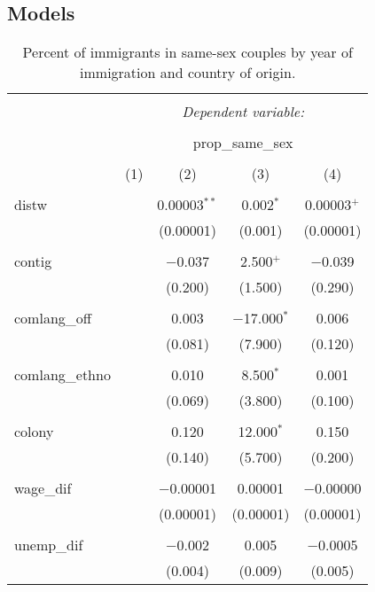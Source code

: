 \documentclass[
  11pt,
]{article}
\begin{document}
\hypertarget{models}{%
\subsection{Models}\label{models}}

\begin{table}[!htbp] \centering 
  \caption{Percent of immigrants in same-sex couples by year of immigration and country of origin.} 
  \label{tab:country-props} 
\begin{tabular}{@{\extracolsep{5pt}}lcccc} 
\\[-1.8ex]\hline 
\hline \\[-1.8ex] 
 & \multicolumn{4}{c}{\textit{Dependent variable:}} \\ 
\cline{2-5} 
\\[-1.8ex] & \multicolumn{4}{c}{prop\_same\_sex} \\ 
\\[-1.8ex] & (1) & (2) & (3) & (4)\\ 
\hline \\[-1.8ex] 
 distw &  & 0.00003$^{**}$ & 0.002$^{*}$ & 0.00003$^{+}$ \\ 
  &  & (0.00001) & (0.001) & (0.00001) \\ 
  & & & & \\ 
 contig &  & $-$0.037 & 2.500$^{+}$ & $-$0.039 \\ 
  &  & (0.200) & (1.500) & (0.290) \\ 
  & & & & \\ 
 comlang\_off &  & 0.003 & $-$17.000$^{*}$ & 0.006 \\ 
  &  & (0.081) & (7.900) & (0.120) \\ 
  & & & & \\ 
 comlang\_ethno &  & 0.010 & 8.500$^{*}$ & 0.001 \\ 
  &  & (0.069) & (3.800) & (0.100) \\ 
  & & & & \\ 
 colony &  & 0.120 & 12.000$^{*}$ & 0.150 \\ 
  &  & (0.140) & (5.700) & (0.200) \\ 
  & & & & \\ 
 wage\_dif &  & $-$0.00001 & 0.00001 & $-$0.00000 \\ 
  &  & (0.00001) & (0.00001) & (0.00001) \\ 
  & & & & \\ 
 unemp\_dif &  & $-$0.002 & 0.005 & $-$0.0005 \\ 
  &  & (0.004) & (0.009) & (0.005) \\ 

\end{tabular}
\end{table}
\end{document}
